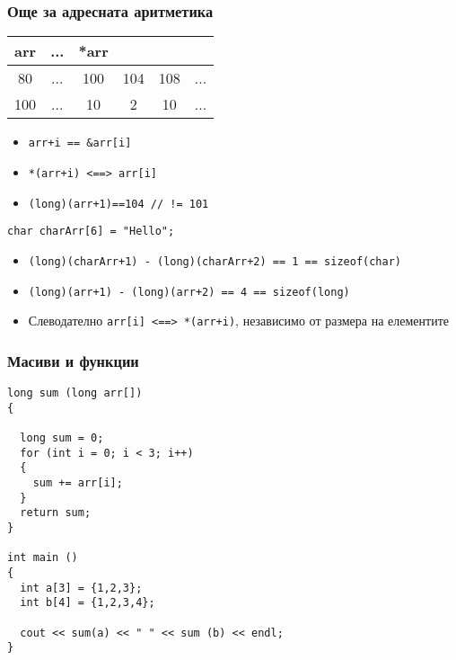\documentclass{beamer}
\begin{document}
\begin{frame}[fragile]
\frametitle{Още за адресната аритметика}


\begin{tabular} {c | c | c | c | c | c }

arr &... &*arr \\\hline
80  &... & 100 & 104 & 108 &... \\\hline
100 &... & 10   & 2   & 10   &... \\\hline
  
\end{tabular}

\vspace{15px}

\begin{itemize}
\item \texttt{arr+i == \&arr[i]}
\pause
\item \texttt{*(arr+i) <==> arr[i]}
\pause
\item \texttt{(long)(arr+1)==104 // != 101}
\end{itemize}

\pause

\begin{flushleft}
\begin{lstlisting}
char charArr[6] = "Hello";
\end{lstlisting}
\end{flushleft}

\begin{itemize}
  \item \texttt{(long)(charArr+1) - (long)(charArr+2) == 1 == sizeof(char)}
  \item \texttt{(long)(arr+1) - (long)(arr+2) == 4 == sizeof(long)}
  \item Слеводателно \texttt{arr[i] <==> *(arr+i)}, независимо от размера на елементите
\end{itemize}


\end{frame}




\begin{frame}[fragile]
\frametitle{Масиви и функции}

\begin{flushleft}
\begin{lstlisting}
long sum (long arr[])
{
  
  long sum = 0;
  for (int i = 0; i < 3; i++)
  {
    sum += arr[i];
  }
  return sum;
}

int main ()
{
  int a[3] = {1,2,3};
  int b[4] = {1,2,3,4};

  cout << sum(a) << " " << sum (b) << endl;
}

\end{lstlisting}
\end{flushleft}

\end{frame}
\end{document}
